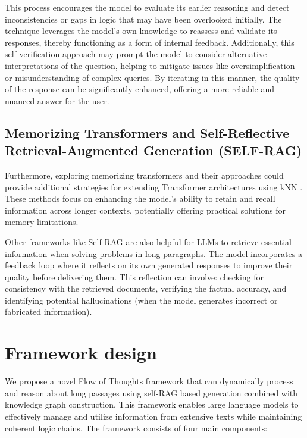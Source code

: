 \documentclass{article}
\begin{document}
This process encourages the model to evaluate its earlier reasoning and detect inconsistencies or gaps in logic that may have been overlooked initially. The technique leverages the model's own knowledge to reassess and validate its responses, thereby functioning as a form of internal feedback. Additionally, this self-verification approach may prompt the model to consider alternative interpretations of the question, helping to mitigate issues like oversimplification or misunderstanding of complex queries. By iterating in this manner, the quality of the response can be significantly enhanced, offering a more reliable and nuanced answer for the user.

\subsection{Memorizing Transformers and Self-Reflective Retrieval-Augmented Generation (SELF-RAG)}

Furthermore, exploring memorizing transformers and their approaches could provide additional strategies for extending Transformer architectures using kNN \cite{wu2022memorizingtransformers}. These methods focus on enhancing the model's ability to retain and recall information across longer contexts, potentially offering practical solutions for memory limitations.

Other frameworks like Self-RAG \cite{asai2023selfraglearningretrievegenerate} are also helpful for LLMs to retrieve essential information when solving problems in long paragraphs. The model incorporates a feedback loop where it reflects on its own generated responses to improve their quality before delivering them. This reflection can involve: checking for consistency with the retrieved documents, verifying the factual accuracy, and identifying potential hallucinations (when the model generates incorrect or fabricated information).

\section{Framework design}

We propose a novel Flow of Thoughts framework that can dynamically process and reason about long passages using self-RAG based generation combined with knowledge graph construction. This framework enables large language models to effectively manage and utilize information from extensive texts while maintaining coherent logic chains. The framework consists of four main components:
\end{document}
